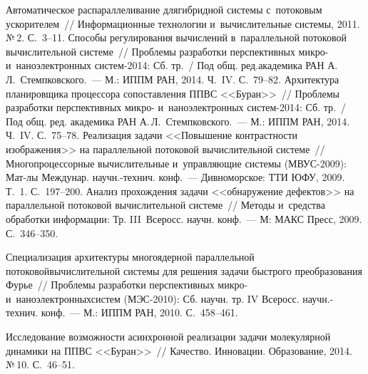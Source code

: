 \begin{multicols}{2}
{{\begin{thebibliography}{99}
Автоматическое распараллеливание для\linebreak гибридной системы с~потоковым 
ускорителем~// Информационные технологии и~вычислительные системы, 
2011. №\,2. С.~3--11.
   Способы 
регулирования вычислений в~параллельной потоковой вычислительной 
системе~// Проблемы разработки перспективных микро- и~наноэлектронных 
систем-2014: Сб. тр.~/ Под общ. ред.\linebreak академика РАН 
А.\,Л.~Стемпковского.~--- М.: ИППМ РАН, 2014. Ч.~IV. С.~79--82.
Архитектура планировщика процессора сопоставления ППВС <<Буран>>~// 
Проблемы разработки перспективных микро- и~наноэлектронных сис\-тем-2014: 
Сб. тр.~/ Под общ. ред. академика РАН А.\,Л.~Стемпковского.~--- М.: 
ИППМ РАН, 2014. Ч.~IV. С.~75--78.
   Реализация задачи 
<<Повышение контрастности изображения>> на параллельной потоковой 
вычислительной системе~// Многопроцессорные вычислительные 
и~управ\-ля\-ющие системы (МВУС-2009): Мат-лы Междунар. научн.-технич. 
конф.~--- Дивноморское: ТТИ ЮФУ, 2009. Т.~1. С.~197--200.
   Анализ прохождения задачи 
<<обнаружение дефектов>> на параллельной потоковой вычислительной 
системе~// Методы и~средства обработки информации: Тр. III~Всеросс. научн. 
конф.~--- М: МАКС Пресс, 2009. С.~346--350.

   Специализация архитектуры 
многоядерной параллельной потоковой\linebreak вы\-чис\-ли\-тель\-ной сис\-те\-мы для 
решения задачи быст\-ро\-го преобразования Фурье~// Проб\-ле\-мы разработки 
перспективных микро- и~наноэлектронных\linebreak сис\-тем (МЭС-2010): Сб. 
научн. тр. IV Всеросс. научн.-технич. конф.~--- М.: ИППМ РАН, 2010.  
С.~458--461.

   Исследование возможности асинхронной реализации 
задачи молекулярной динамики на ППВС <<Буран>>~// Качество. Инновации. 
Образование, 2014. №\,10. С.~46--51.
 

\end{thebibliography}}}
\end{multicols}
